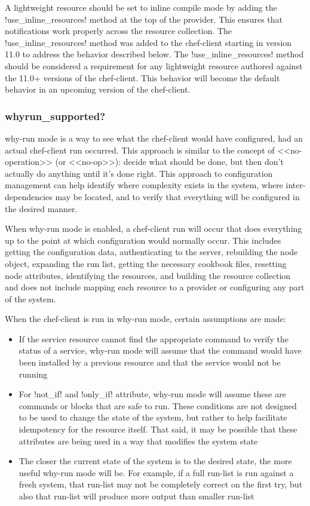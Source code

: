 A lightweight resource should be set to inline compile mode by adding the \inline!use_inline_resources! method at the top of the provider. This ensures that notifications work properly across the resource collection. The \inline!use_inline_resources! method was added to the chef-client starting in version 11.0 to address the behavior described below. The \inline!use_inline_resources! method should be considered a requirement for any lightweight resource authored against the 11.0+ versions of the chef-client. This behavior will become the default behavior in an upcoming version of the chef-client.

\subsubsection{whyrun\_supported?}

why-run mode is a way to see what the chef-client would have configured, had an actual chef-client run occurred. This approach is similar to the concept of <<no-operation>> (or <<no-op>>): decide what should be done, but then don't actually do anything until it's done right. This approach to configuration management can help identify where complexity exists in the system, where inter-dependencies may be located, and to verify that everything will be configured in the desired manner.

When why-run mode is enabled, a chef-client run will occur that does everything up to the point at which configuration would normally occur. This includes getting the configuration data, authenticating to the server, rebuilding the node object, expanding the run list, getting the necessary cookbook files, resetting node attributes, identifying the resources, and building the resource collection and does not include mapping each resource to a provider or configuring any part of the system.

When the chef-client is run in why-run mode, certain assumptions are made:

\begin{itemize}
  \item If the service resource cannot find the appropriate command to verify the status of a service, why-run mode will assume that the command would have been installed by a previous resource and that the service would not be running
  \item For \inline!not_if! and \inline!only_if! attribute, why-run mode will assume these are commands or blocks that are safe to run. These conditions are not designed to be used to change the state of the system, but rather to help facilitate idempotency for the resource itself. That said, it may be possible that these attributes are being used in a way that modifies the system state
  \item The closer the current state of the system is to the desired state, the more useful why-run mode will be. For example, if a full run-list is run against a fresh system, that run-list may not be completely correct on the first try, but also that run-list will produce more output than smaller run-list
\end{itemize}

